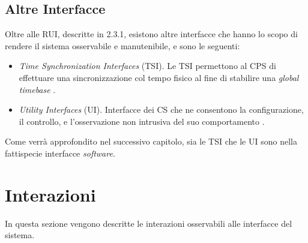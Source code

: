 	\subsection{Altre Interfacce}
	Oltre alle RUI, descritte in 2.3.1, esistono altre interfacce che hanno lo scopo di rendere il sistema osservabile e manutenibile, e sono le seguenti:	\cite{cecca}
	\begin{itemize}
		\item \emph{Time Synchronization Interfaces} (TSI). Le TSI permettono al CPS di effettuare una sincronizzazione col tempo fisico al fine di stabilire una \emph{global timebase} \cite{clock}.
		\item \emph{Utility Interfaces} (UI). Interfacce dei CS che ne consentono la configurazione, il controllo, e l'osservazione non intrusiva del suo comportamento \cite{monitoring}.
	\end{itemize}
	Come verr\`a approfondito nel successivo capitolo, sia le TSI che le UI sono nella fattispecie interfacce \emph{software}.
	\section{Interazioni}
	In questa sezione vengono descritte le interazioni osservabili alle interfacce del sistema.
